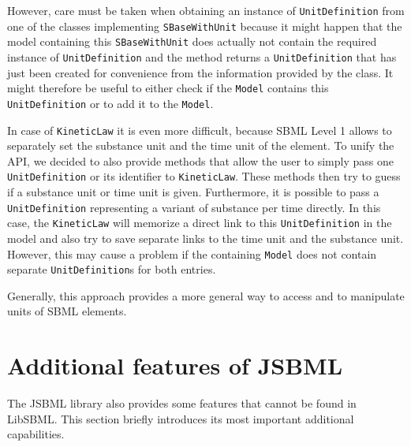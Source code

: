 \documentclass[
  BCOR12mm,
  letterpaper,
  11pt,
  headsepline,
  pointlessnumbers,
  tablecaptionabove,
  onelinecaption,
  headinclude,
  appendixprefix,
  idxtotoc,
  bibtotoc,
  twoside,
  titlepage
]{scrartcl}
\begin{document}
However, care must be taken when obtaining an instance of \texttt{UnitDefinition}
from one of the classes implementing \texttt{SBaseWithUnit}
because it might happen that the model containing this \texttt{SBaseWithUnit}
does actually not contain the required instance of \texttt{UnitDefinition} and
the method returns a \texttt{UnitDefinition} that has just been created for
convenience from the information provided by the class. It might therefore be
useful to either check if the \texttt{Model} contains this
\texttt{UnitDefinition}
or to add it to the \texttt{Model}.

In case of \texttt{KineticLaw}
it is even more difficult, because
SBML Level 1 allows to separately set the substance unit and the time unit of
the element. To unify the API, we decided to also provide methods that allow
the user to simply pass one \texttt{UnitDefinition}
or its identifier to
\texttt{KineticLaw}.
These methods then try to guess if a substance unit or time
unit is given. Furthermore, it is possible to pass a \texttt{UnitDefinition}
representing a variant of substance per time directly. In this case, the
\texttt{KineticLaw}
will memorize a direct link to this \texttt{UnitDefinition}
in the model and also try to save separate links to the time unit and the
substance unit. However, this may cause a problem if the containing
\texttt{Model} does not contain separate \texttt{UnitDefinition}s for both
entries.

Generally, this approach provides a more general way to access and to manipulate
units of SBML elements.

\section{Additional features of JSBML}

The JSBML library also provides some features that cannot be found in LibSBML.
This section briefly introduces its most important additional capabilities.
\end{document}
